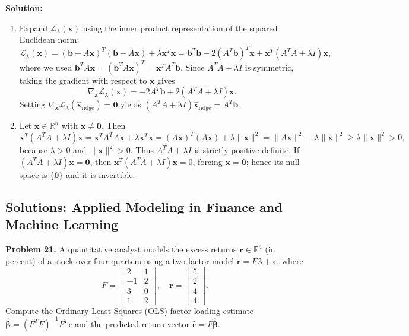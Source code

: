 \documentclass[11pt, letterpaper]{article}
\theoremstyle{definition}
\theoremstyle{remark}
\begin{document}
\textbf{Solution:}
\begin{enumerate}[label=(\alph*)]
    \item Expand $\mathcal{L}_{\lambda}(\mathbf{x})$ using the inner product representation of the squared Euclidean norm:
    \[
    \mathcal{L}_{\lambda}(\mathbf{x}) = (\mathbf{b} - A\mathbf{x})^T(\mathbf{b} - A\mathbf{x}) + \lambda \mathbf{x}^T \mathbf{x} = \mathbf{b}^T \mathbf{b} - 2(A^T \mathbf{b})^T \mathbf{x} + \mathbf{x}^T (A^T A + \lambda I) \mathbf{x},
    \]
    where we used $\mathbf{b}^T A\mathbf{x} = (\mathbf{b}^T A\mathbf{x})^T = \mathbf{x}^T A^T \mathbf{b}$. Since $A^T A + \lambda I$ is symmetric, taking the gradient with respect to $\mathbf{x}$ gives
    \[
    \nabla_{\mathbf{x}} \mathcal{L}_{\lambda}(\mathbf{x}) = -2A^T \mathbf{b} + 2(A^T A + \lambda I)\mathbf{x}.
    \]
    Setting $\nabla_{\mathbf{x}} \mathcal{L}_{\lambda}(\hat{\mathbf{x}}_{\text{ridge}}) = \mathbf{0}$ yields $(A^T A + \lambda I)\hat{\mathbf{x}}_{\text{ridge}} = A^T \mathbf{b}$.
    \item Let $\mathbf{x} \in \mathbb{R}^n$ with $\mathbf{x} \neq \mathbf{0}$. Then
    \[
    \mathbf{x}^T (A^T A + \lambda I)\mathbf{x} = \mathbf{x}^T A^T A \mathbf{x} + \lambda \mathbf{x}^T \mathbf{x} = (A\mathbf{x})^T(A\mathbf{x}) + \lambda \|\mathbf{x}\|^2 = \|A\mathbf{x}\|^2 + \lambda \|\mathbf{x}\|^2 \ge \lambda \|\mathbf{x}\|^2 > 0,
    \]
    because $\lambda > 0$ and $\|\mathbf{x}\|^2 > 0$. Thus $A^T A + \lambda I$ is strictly positive definite. If $(A^T A + \lambda I)\mathbf{x} = \mathbf{0}$, then $\mathbf{x}^T(A^T A + \lambda I)\mathbf{x} = 0$, forcing $\mathbf{x} = \mathbf{0}$; hence its null space is $\{\mathbf{0}\}$ and it is invertible.
\end{enumerate}

\subsection{Solutions: Applied Modeling in Finance and Machine Learning}

\textbf{Problem 21.} A quantitative analyst models the excess returns $\mathbf{r} \in \mathbb{R}^4$ (in percent) of a stock over four quarters using a two-factor model $\mathbf{r} = F\boldsymbol{\beta} + \boldsymbol{\epsilon}$, where
\[
F = \begin{bmatrix} 2 & 1 \\ -1 & 2 \\ 3 & 0 \\ 1 & 2 \end{bmatrix}, \quad \mathbf{r} = \begin{bmatrix} 5 \\ 2 \\ 4 \\ 4 \end{bmatrix}.
\]
Compute the Ordinary Least Squares (OLS) factor loading estimate $\hat{\boldsymbol{\beta}} = (F^T F)^{-1} F^T \mathbf{r}$ and the predicted return vector $\hat{\mathbf{r}} = F\hat{\boldsymbol{\beta}}$.
\end{document}

